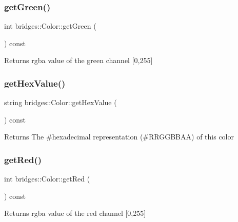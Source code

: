 \subsubsection{\texorpdfstring{get\+Green()}{getGreen()}}
{\footnotesize\ttfamily int bridges\+::\+Color\+::get\+Green (\begin{DoxyParamCaption}{ }\end{DoxyParamCaption}) const\hspace{0.3cm}{\ttfamily [inline]}}

\begin{DoxyReturn}{Returns}
rgba value of the green channel \mbox{[}0,255\mbox{]} 
\end{DoxyReturn}
\hypertarget{classbridges_1_1_color_a051fa9e828ce7025093c65c46358a8cf}{}\label{classbridges_1_1_color_a051fa9e828ce7025093c65c46358a8cf} 
\subsubsection{\texorpdfstring{get\+Hex\+Value()}{getHexValue()}}
{\footnotesize\ttfamily string bridges\+::\+Color\+::get\+Hex\+Value (\begin{DoxyParamCaption}{ }\end{DoxyParamCaption}) const\hspace{0.3cm}{\ttfamily [inline]}}

\begin{DoxyReturn}{Returns}
The \#hexadecimal representation (\#\+R\+R\+G\+G\+B\+B\+AA) of this color 
\end{DoxyReturn}
\hypertarget{classbridges_1_1_color_a4c81e33854a6fdba9a3030e97ec8609e}{}\label{classbridges_1_1_color_a4c81e33854a6fdba9a3030e97ec8609e} 
\subsubsection{\texorpdfstring{get\+Red()}{getRed()}}
{\footnotesize\ttfamily int bridges\+::\+Color\+::get\+Red (\begin{DoxyParamCaption}{ }\end{DoxyParamCaption}) const\hspace{0.3cm}{\ttfamily [inline]}}

\begin{DoxyReturn}{Returns}
rgba value of the red channel \mbox{[}0,255\mbox{]} 
\end{DoxyReturn}
\hypertarget{classbridges_1_1_color_ae55f3077cb3bd93386dc11eaeecf823c}{}\label{classbridges_1_1_color_ae55f3077cb3bd93386dc11eaeecf823c} 
